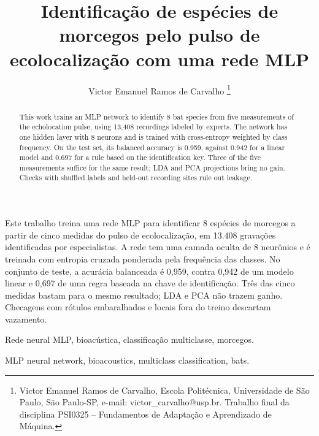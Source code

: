 \documentclass{sbrt}
\begin{document}
\title{Identificação de espécies de morcegos pelo pulso de ecolocalização com uma rede MLP}

\author{Victor Emanuel Ramos de Carvalho
\thanks{Victor Emanuel Ramos de Carvalho, Escola Politécnica, Universidade de São Paulo, São Paulo-SP, e-mail: victor\_carvalho@usp.br. Trabalho final da disciplina PSI0325 -- Fundamentos de Adaptação e Aprendizado de Máquina.}%
}

\maketitle


\begin{resumo}
Este trabalho treina uma rede MLP para identificar 8 espécies de morcegos a partir de cinco medidas do pulso de ecolocalização, em 13.408 gravações identificadas por especialistas. A rede tem uma camada oculta de 8 neurônios e é treinada com entropia cruzada ponderada pela frequência das classes. No conjunto de teste, a acurácia balanceada é 0,959, contra 0,942 de um modelo linear e 0,697 de uma regra baseada na chave de identificação. Três das cinco medidas bastam para o mesmo resultado; LDA e PCA não trazem ganho. Checagens com rótulos embaralhados e locais fora do treino descartam vazamento.
\end{resumo}
\begin{chave}
Rede neural MLP, bioacústica, classificação multiclasse, morcegos.
\end{chave}

\begin{abstract}
This work trains an MLP network to identify 8 bat species from five measurements of the echolocation pulse, using 13,408 recordings labeled by experts. The network has one hidden layer with 8 neurons and is trained with cross-entropy weighted by class frequency. On the test set, its balanced accuracy is 0.959, against 0.942 for a linear model and 0.697 for a rule based on the identification key. Three of the five measurements suffice for the same result; LDA and PCA projections bring no gain. Checks with shuffled labels and held-out recording sites rule out leakage.
\end{abstract}
\begin{keywords}
MLP neural network, bioacoustics, multiclass classification, bats.
\end{keywords}
\end{document}
